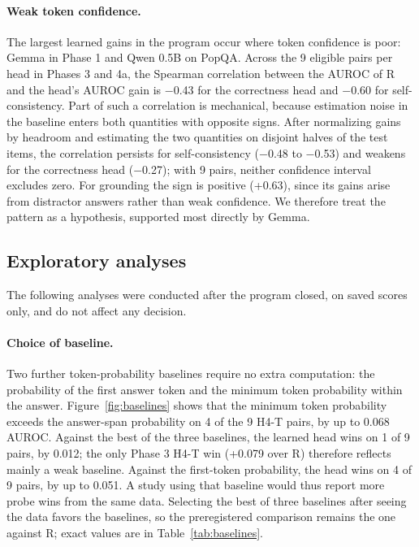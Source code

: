 \documentclass[10pt]{article}
\begin{document}
\paragraph{Weak token confidence.} The largest learned gains in the program occur where token confidence is poor: Gemma in Phase 1 and Qwen 0.5B on PopQA. Across the 9 eligible pairs per head in Phases 3 and 4a, the Spearman correlation between the AUROC of R and the head's AUROC gain is $-$0.43 for the correctness head and $-$0.60 for self-consistency. Part of such a correlation is mechanical, because estimation noise in the baseline enters both quantities with opposite signs. After normalizing gains by headroom and estimating the two quantities on disjoint halves of the test items, the correlation persists for self-consistency ($-$0.48 to $-$0.53) and weakens for the correctness head ($-$0.27); with 9 pairs, neither confidence interval excludes zero. For grounding the sign is positive (+0.63), since its gains arise from distractor answers rather than weak confidence. We therefore treat the pattern as a hypothesis, supported most directly by Gemma.

\subsection{Exploratory analyses}
\label{sec:exploratory}

The following analyses were conducted after the program closed, on saved scores only, and do not affect any decision.

\paragraph{Choice of baseline.} Two further token-probability baselines require no extra computation: the probability of the first answer token and the minimum token probability within the answer. Figure~\ref{fig:baselines} shows that the minimum token probability exceeds the answer-span probability on 4 of the 9 H4-T pairs, by up to 0.068 AUROC. Against the best of the three baselines, the learned head wins on 1 of 9 pairs, by 0.012; the only Phase 3 H4-T win (+0.079 over R) therefore reflects mainly a weak baseline. Against the first-token probability, the head wins on 4 of 9 pairs, by up to 0.051. A study using that baseline would thus report more probe wins from the same data. Selecting the best of three baselines after seeing the data favors the baselines, so the preregistered comparison remains the one against R; exact values are in Table~\ref{tab:baselines}.
\end{document}
